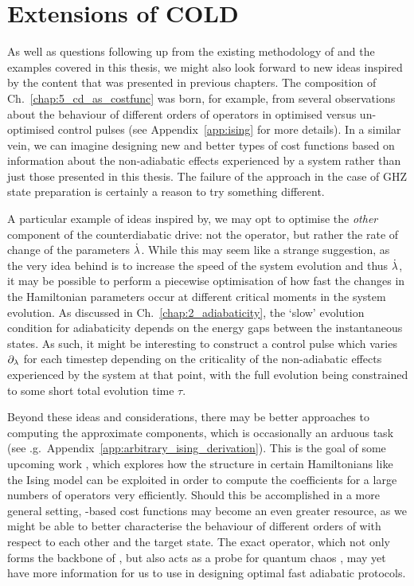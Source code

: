 \section{Extensions of COLD}

As well as questions following up from the existing methodology of  and the examples covered in this thesis, we might also look forward to new ideas inspired by the content that was presented in previous chapters. The composition of Ch.~\ref{chap:5_cd_as_costfunc} was born, for example, from several observations about the behaviour of different orders of  operators in optimised versus un-optimised control pulses (see Appendix~\ref{app:ising} for more details). In a similar vein, we can imagine designing new and better types of cost functions based on information about the non-adiabatic effects experienced by a system rather than just those presented in this thesis. The failure of the approach in the case of GHZ state preparation is certainly a reason to try something different.

A particular example of ideas inspired by, we may opt to optimise the \emph{other} component of the counterdiabatic drive: not the  operator, but rather the rate of change of the parameters $\dot{\lambda}$. While this may seem like a strange suggestion, as the very idea behind  is to increase the speed of the system evolution and thus $\dot{\lambda}$, it may be possible to perform a piecewise optimisation of how fast the changes in the Hamiltonian parameters occur at different critical moments in the system evolution. As discussed in Ch.~\ref{chap:2_adiabaticity}, the `slow' evolution condition for adiabaticity depends on the energy gaps between the instantaneous states. As such, it might be interesting to construct a control pulse which varies $\partial_{\lambda}$ for each timestep depending on the criticality of the non-adiabatic effects experienced by the system at that point, with the full evolution being constrained to some short total evolution time $\tau$.

Beyond these ideas and considerations, there may be better approaches to computing the approximate  components, which is occasionally an arduous task (see \@e.g.~Appendix~\ref{app:arbitrary_ising_derivation}). This is the goal of some upcoming work \cite{lawrence_numerical_2023}, which explores how the structure in certain Hamiltonians like the Ising model can be exploited in order to compute the  coefficients for a large numbers of operators very efficiently. Should this be accomplished in a more general setting, -based cost functions may become an even greater resource, as we might be able to better characterise the behaviour of different orders of  with respect to each other and the target state. The exact  operator, which not only forms the backbone of  \cite{kolodrubetz_geometry_2017, sels_minimizing_2017}, but also acts as a probe for quantum chaos \cite{pandey_adiabatic_2020, bhattacharjee_lanczos_2023}, may yet have more information for us to use in designing optimal fast adiabatic protocols.